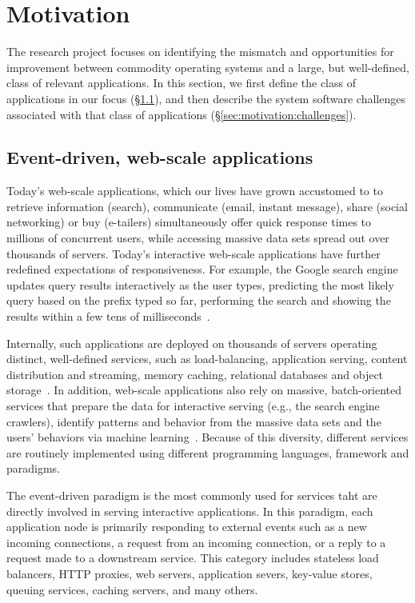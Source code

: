 
\section{Motivation}
\label{sec:motivation}

The research project focuses on identifying the mismatch and
opportunities for improvement between commodity operating systems and
a large, but well-defined, class of relevant applications.  In this
section, we first define the class of applications in our focus
(\S\ref{sec:motivation:web}), and then describe the system software
challenges associated with that class of applications
(\S\ref{sec:motivation:challenges}).

\subsection{Event-driven, web-scale applications}
\label{sec:motivation:web}

Today's web-scale applications, which our lives have grown accustomed
to to retrieve information (search), communicate (email, instant
message), share (social networking) or buy (e-tailers) simultaneously
offer quick response times to millions of concurrent users, while
accessing massive data sets spread out over thousands of servers.
Today's interactive web-scale applications have further redefined
expectations of responsiveness. For example, the Google search engine
updates query results interactively as the user types, predicting the
most likely query based on the prefix typed so far, performing the
search and showing the results within a few tens of
milliseconds~\cite{DBLP:journals/cacm/DeanB13}.

Internally, such applications are deployed on thousands of servers
operating distinct, well-defined services, such as load-balancing,
application serving, content distribution and streaming, memory
caching, relational databases and object storage~\cite{missing}.  In
addition, web-scale applications also rely on massive, batch-oriented
services that prepare the data for interactive serving (e.g., the
search engine crawlers), identify patterns and behavior from the
massive data sets and the users' behaviors via machine
learning~\cite{missing}.  Because of this diversity, different
services are routinely implemented using different programming
languages, framework and paradigms.

The event-driven paradigm is the most commonly used for services taht
are directly involved in serving interactive applications.  In this
paradigm, each application node is primarily responding to external
events such as a new incoming connections, a request from an incoming
connection, or a reply to a request made to a downstream service.
This category includes stateless load balancers, HTTP proxies, web
servers, application severs, key-value stores, queuing services,
caching servers, and many others.  

